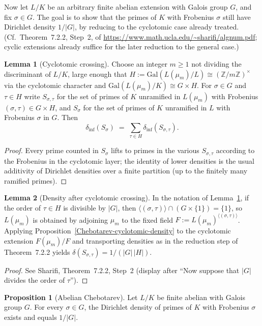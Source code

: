 \documentclass[10pt,a4paper]{article}
\newcommand{\uses}[1]{}
\theoremstyle{definition}
\newtheorem{proposition}{Proposition}[section]
\newtheorem{lemma}{Lemma}[section]
\begin{document}
Now let $L/K$ be an arbitrary finite abelian extension with Galois group $G$, and fix
$\sigma \in G$.  The goal is to show that the primes of $K$ with Frobenius $\sigma$ still have
Dirichlet density $1/|G|$, by reducing to the cyclotomic case already treated.
(Cf.\ Theorem~7.2.2, Step~2, of \url{https://www.math.ucla.edu/~sharifi/algnum.pdf}; cyclic
extensions already suffice for the later reduction to the general case.)
\begin{lemma}[Cyclotomic crossing]\label{Chebotarev-abelian-crossing}
Choose an integer $m\geq 1$ not dividing the discriminant of $L/K$, large enough that
$H := \mathrm{Gal}(L(\mu_m)/L) \cong (\mathbb{Z}/m\mathbb{Z})^\times$ via the cyclotomic character
and $\mathrm{Gal}(L(\mu_m)/K) \cong G \times H$.  For $\sigma\in G$ and $\tau\in H$ write
$S_{\sigma,\tau}$ for the set of primes of $K$ unramified in $L(\mu_m)$ with Frobenius
$(\sigma,\tau)\in G\times H$, and $S_\sigma$ for the set of primes of $K$ unramified in $L$
with Frobenius $\sigma$ in $G$.  Then
\[
\delta_{\mathrm{inf}}(S_\sigma) \;=\; \sum_{\tau\in H} \delta_{\mathrm{inf}}(S_{\sigma,\tau}).
\]
\end{lemma}
\begin{proof}
Every prime counted in $S_\sigma$ lifts to primes in the various $S_{\sigma,\tau}$ according to
the Frobenius in the cyclotomic layer; the identity of lower densities is the usual additivity
of Dirichlet densities over a finite partition (up to the finitely many ramified primes).
\end{proof}
\begin{lemma}[Density after cyclotomic crossing]\label{Chebotarev-abelian-density}
In the notation of Lemma~\ref{Chebotarev-abelian-crossing}, if the order of $\tau\in H$ is
divisible by $|G|$, then $\langle(\sigma,\tau)\rangle \cap (G\times\{1\}) = \{1\}$, so
$L(\mu_m)$ is obtained by adjoining $\mu_m$ to the fixed field
$F := L(\mu_m)^{\langle(\sigma,\tau)\rangle}$.  Applying Proposition~\ref{Chebotarev-cyclotomic-density}
to the cyclotomic extension $F(\mu_m)/F$ and transporting densities as in the reduction step
of Theorem~7.2.2 yields $\delta(S_{\sigma,\tau}) = 1/(|G|\,|H|)$.
\end{lemma}
\begin{proof}\uses{Chebotarev-cyclotomic-density, Chebotarev-abelian-crossing}
See Sharifi, Theorem~7.2.2, Step~2 (display after ``Now suppose that $|G|$ divides the order of
$\tau$'').
\end{proof}
\begin{proposition}[Abelian Chebotarev]\label{Chebotarev-abelian}
Let $L/K$ be finite abelian with Galois group $G$.  For every $\sigma\in G$, the Dirichlet
density of primes of $K$ with Frobenius $\sigma$ exists and equals $1/|G|$.
\end{proposition}
\end{document}
